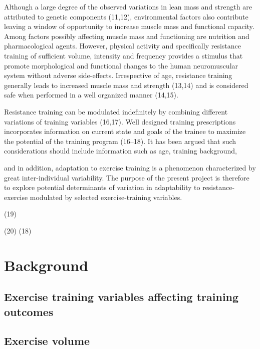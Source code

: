 \documentclass[twoside,10pt]{gihclass} %
\begin{document}
Although a large degree of the observed variations in lean mass and strength are attributed to genetic components
(11,12),
environmental factors also contribute leaving a window of opportunity to increase muscle mass and functional capacity. Among factors possibly affecting muscle mass and functioning are nutrition and pharmacological agents. However, physical activity and specifically resistance training of sufficient volume, intensity and frequency provides a stimulus that promote morphological and functional changes to the human neuromuscular system without adverse side-effects. Irrespective of age, resistance training generally leads to increased muscle mass and strength
(13,14)
and is considered safe when performed in a well organized manner
(14,15).

Resistance training can be modulated indefinitely by combining different variations of training variables
(16,17).
Well designed training prescriptions incorporates information on current state and goals of the trainee to maximize the potential of the training program
(16--18).
It has been argued that such considerations should include information such as age, training background,

and in addition, adaptation to exercise training is a phenomenon characterized by great inter-individual variability. The purpose of the present project is therefore to explore potential determinants of variation in adaptability to resistance-exercise modulated by selected exercise-training variables.

(19)

(20)
(18)

\hypertarget{background}{%
\chapter{Background}\label{background}}

\hypertarget{exercise-training-variables-affecting-training-outcomes}{%
\section{Exercise training variables affecting training outcomes}\label{exercise-training-variables-affecting-training-outcomes}}

\hypertarget{exercise-volume}{%
\section{Exercise volume}\label{exercise-volume}}
\end{document}
